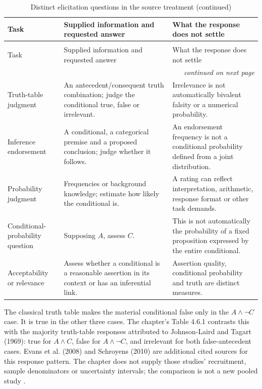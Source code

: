 \begin{longtable}{@{}p{}p{}p{}@{}}
\caption{Distinct elicitation questions in the source treatment.}
\label{tab:p19-rat46-tasks}\\
\toprule
Task & Supplied information and requested answer & What the response does not settle\\
\midrule\endfirsthead
\caption[]{Distinct elicitation questions in the source treatment (continued)}\\
\toprule Task & Supplied information and requested answer & What the response does not settle\\
\midrule\endhead
\midrule\multicolumn{3}{r}{\emph{continued on next page}}\\
\endfoot
\endlastfoot
Truth-table judgment & An antecedent/consequent truth combination;
judge the conditional true, false or irrelevant. & Irrelevance is not
automatically bivalent falsity or a numerical probability.\\\addlinespace
Inference endorsement & A conditional, a categorical premise and a
proposed conclusion; judge whether it follows. & An endorsement frequency
is not a conditional probability defined from a joint distribution.\\\addlinespace
Probability judgment & Frequencies or background knowledge; estimate
how likely the conditional is. & A rating can reflect interpretation,
arithmetic, response format or other task demands.\\\addlinespace
Conditional-probability question & Supposing \(A\), assess \(C\). &
This is not automatically the probability of a fixed proposition
expressed by the entire conditional.\\\addlinespace
Acceptability or relevance & Assess whether a conditional is a
reasonable assertion in its context or has an inferential link. &
Assertion quality, conditional probability and truth are distinct measures.\\
\bottomrule
\end{longtable}

The classical truth table makes the material conditional false only in
the \(A\land\neg C\) case. It is true in the other three cases.
The chapter's Table 4.6.1 contrasts this with the majority truth-table
responses attributed to Johnson-Laird and Tagart (1969): true for
\(A\land C\), false for \(A\land\neg C\), and irrelevant for
both false-antecedent cases. Evans et al. (2008) and Schroyens (2010)
are additional cited sources for this response pattern. The chapter
does not supply those studies' recruitment, sample denominators or
uncertainty intervals; the comparison is not a new pooled study
\cite[pp.~295--296]{OberauerPessach2021ProbabilitiesConditionals}.

